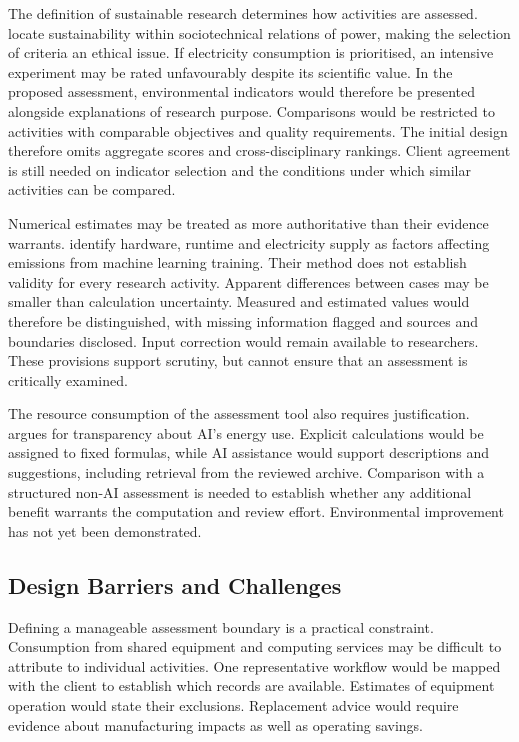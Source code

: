 \documentclass[11pt,a4paper]{article}
\begin{document}
The definition of sustainable research determines how activities are assessed. \citet{hasselbalch2025sustainability} locate sustainability within sociotechnical relations of power, making the selection of criteria an ethical issue. If electricity consumption is prioritised, an intensive experiment may be rated unfavourably despite its scientific value. In the proposed assessment, environmental indicators would therefore be presented alongside explanations of research purpose. Comparisons would be restricted to activities with comparable objectives and quality requirements. The initial design therefore omits aggregate scores and cross-disciplinary rankings. Client agreement is still needed on indicator selection and the conditions under which similar activities can be compared.

Numerical estimates may be treated as more authoritative than their evidence warrants. \citet{lacoste2019carbon} identify hardware, runtime and electricity supply as factors affecting emissions from machine learning training. Their method does not establish validity for every research activity. Apparent differences between cases may be smaller than calculation uncertainty. Measured and estimated values would therefore be distinguished, with missing information flagged and sources and boundaries disclosed. Input correction would remain available to researchers. These provisions support scrutiny, but cannot ensure that an assessment is critically examined.

The resource consumption of the assessment tool also requires justification. \citet{lin2023cost} argues for transparency about AI's energy use. Explicit calculations would be assigned to fixed formulas, while AI assistance would support descriptions and suggestions, including retrieval from the reviewed archive. Comparison with a structured non-AI assessment is needed to establish whether any additional benefit warrants the computation and review effort. Environmental improvement has not yet been demonstrated.

\subsection{Design Barriers and Challenges}

Defining a manageable assessment boundary is a practical constraint. Consumption from shared equipment and computing services may be difficult to attribute to individual activities. One representative workflow would be mapped with the client to establish which records are available. Estimates of equipment operation would state their exclusions. Replacement advice would require evidence about manufacturing impacts as well as operating savings.
\end{document}
